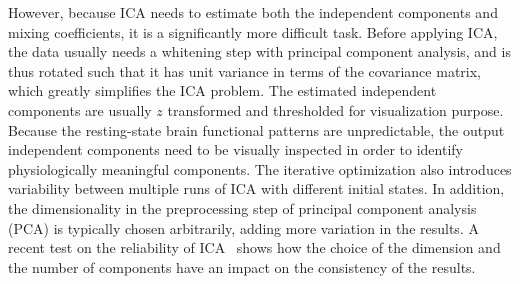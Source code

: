 However, because ICA needs to estimate both the independent components and
mixing coefficients, it is a significantly more difficult task. Before applying
ICA, the data usually needs a whitening step with principal component analysis,
and is thus rotated such that it has unit variance in terms of the covariance
matrix, which greatly simplifies the ICA problem. The estimated independent
components are usually $z$ transformed and thresholded for visualization
purpose. Because the resting-state brain functional patterns are unpredictable,
the output independent components need to be visually inspected in order to
identify physiologically meaningful components. The iterative optimization also
introduces variability between multiple runs of ICA with different initial
states. In addition, the dimensionality in the preprocessing step of principal
component analysis (PCA) is typically chosen arbitrarily, adding more variation
in the results. A recent test on the reliability of ICA~\cite{zuo2010reliable}
shows how the choice of the dimension and the number of components have an
impact on the consistency of the results.

